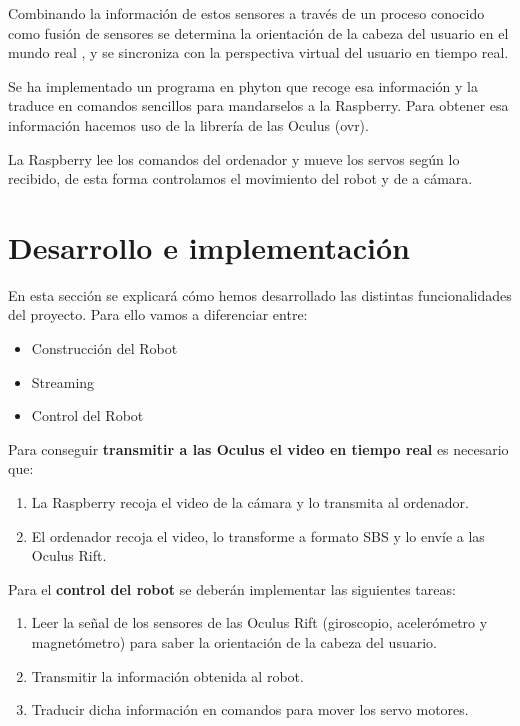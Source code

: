 \documentclass[twoside, 12pt]{epstfg}
\begin{document}
Combinando la información de estos sensores a través de un proceso conocido como fusión de sensores se determina la orientación de la cabeza del usuario en el mundo real , y se sincroniza con la perspectiva virtual del usuario en tiempo real. 

Se ha implementado un programa en phyton que recoge esa información y la traduce en comandos sencillos para mandarselos a la Raspberry. Para obtener esa información hacemos uso de la librería de las Oculus (ovr).

La Raspberry lee los comandos del ordenador y mueve los servos según lo recibido, de esta forma controlamos el movimiento del robot y de a cámara.

\newpage
\section{Desarrollo e implementación}
En esta sección se explicará cómo hemos desarrollado las distintas funcionalidades del proyecto.
Para ello vamos a diferenciar entre:

\begin{itemize}
	\item Construcción del Robot
	\item Streaming 
	\item Control del Robot
\end{itemize}

Para conseguir \textbf{transmitir a las Oculus el video en tiempo real} es necesario que:
\begin{enumerate}
	\item La Raspberry recoja el video de la cámara y lo transmita al ordenador.
	
	\item El ordenador recoja el video, lo transforme a formato SBS y lo envíe a las Oculus Rift. 
	
\end{enumerate}





Para el \textbf{control del robot} se deberán implementar las siguientes tareas:

\begin{enumerate}
	\item Leer la señal de los sensores de las Oculus Rift (giroscopio, acelerómetro y magnetómetro) para saber la orientación de la cabeza del usuario.
	
	\item Transmitir la información obtenida al robot.
	
	\item Traducir dicha información en comandos para mover los servo motores.
\end{enumerate} 
\end{document}
